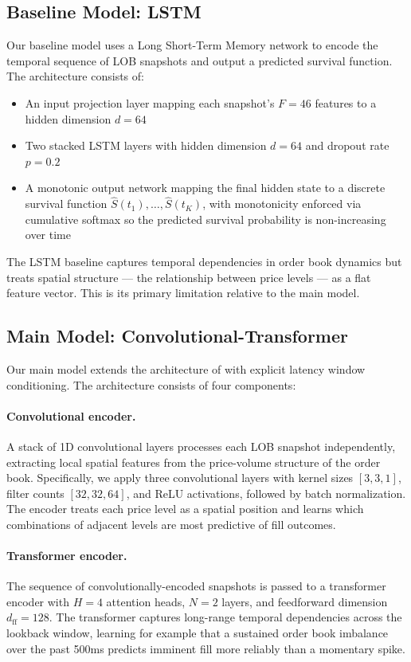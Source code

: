 \documentclass[12pt]{article}
\begin{document}
\subsection{Baseline Model: LSTM}

Our baseline model uses a Long Short-Term Memory network to encode the temporal sequence of LOB snapshots and output a predicted survival function. The architecture consists of:
\begin{itemize}[leftmargin=2em]
  \item An input projection layer mapping each snapshot's $F = 46$ features to a hidden dimension $d = 64$
  \item Two stacked LSTM layers with hidden dimension $d = 64$ and dropout rate $p = 0.2$
  \item A monotonic output network mapping the final hidden state to a discrete survival function $\hat{S}(t_1), \ldots, \hat{S}(t_K)$, with monotonicity enforced via cumulative softmax so the predicted survival probability is non-increasing over time
\end{itemize}

The LSTM baseline captures temporal dependencies in order book dynamics but treats spatial structure --- the relationship between price levels --- as a flat feature vector. This is its primary limitation relative to the main model.

\subsection{Main Model: Convolutional-Transformer}

Our main model extends the architecture of \citet{arroyo2024} with explicit latency window conditioning. The architecture consists of four components:

\paragraph{Convolutional encoder.} A stack of 1D convolutional layers processes each LOB snapshot independently, extracting local spatial features from the price-volume structure of the order book. Specifically, we apply three convolutional layers with kernel sizes $[3, 3, 1]$, filter counts $[32, 32, 64]$, and ReLU activations, followed by batch normalization. The encoder treats each price level as a spatial position and learns which combinations of adjacent levels are most predictive of fill outcomes.

\paragraph{Transformer encoder.} The sequence of convolutionally-encoded snapshots is passed to a transformer encoder with $H = 4$ attention heads, $N = 2$ layers, and feedforward dimension $d_{\mathrm{ff}} = 128$. The transformer captures long-range temporal dependencies across the lookback window, learning for example that a sustained order book imbalance over the past 500ms predicts imminent fill more reliably than a momentary spike.
\end{document}
